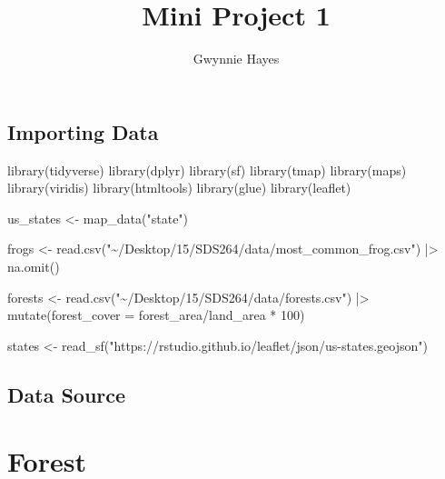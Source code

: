 \documentclass[
  letterpaper,
  DIV=11,
  numbers=noendperiod]{scrartcl}
\title{Mini Project 1}
\author{Gwynnie Hayes}
\date{}
\newenvironment{Shaded}{\begin{snugshade}}{\end{snugshade}}
\newcommand{\DecValTok}[1]{\textcolor[rgb]{0.68,0.00,0.00}{#1}}
\newcommand{\FunctionTok}[1]{\textcolor[rgb]{0.28,0.35,0.67}{#1}}
\newcommand{\NormalTok}[1]{\textcolor[rgb]{0.00,0.23,0.31}{#1}}
\newcommand{\OtherTok}[1]{\textcolor[rgb]{0.00,0.23,0.31}{#1}}
\newcommand{\SpecialCharTok}[1]{\textcolor[rgb]{0.37,0.37,0.37}{#1}}
\newcommand{\StringTok}[1]{\textcolor[rgb]{0.13,0.47,0.30}{#1}}
\begin{document}
\maketitle


\subsection{Importing Data}\label{importing-data}

\begin{Shaded}
\begin{Highlighting}[]
\FunctionTok{library}\NormalTok{(tidyverse)}
\FunctionTok{library}\NormalTok{(dplyr)}
\FunctionTok{library}\NormalTok{(sf)}
\FunctionTok{library}\NormalTok{(tmap)}
\FunctionTok{library}\NormalTok{(maps)}
\FunctionTok{library}\NormalTok{(viridis)}
\FunctionTok{library}\NormalTok{(htmltools)}
\FunctionTok{library}\NormalTok{(glue)}
\FunctionTok{library}\NormalTok{(leaflet)}

\NormalTok{us\_states }\OtherTok{\textless{}{-}} \FunctionTok{map\_data}\NormalTok{(}\StringTok{"state"}\NormalTok{)}

\NormalTok{frogs }\OtherTok{\textless{}{-}} \FunctionTok{read.csv}\NormalTok{(}\StringTok{"\textasciitilde{}/Desktop/15/SDS264/data/most\_common\_frog.csv"}\NormalTok{) }\SpecialCharTok{|\textgreater{}}
  \FunctionTok{na.omit}\NormalTok{()}

\NormalTok{forests }\OtherTok{\textless{}{-}} \FunctionTok{read.csv}\NormalTok{(}\StringTok{"\textasciitilde{}/Desktop/15/SDS264/data/forests.csv"}\NormalTok{) }\SpecialCharTok{|\textgreater{}}
  \FunctionTok{mutate}\NormalTok{(}\StringTok{\textquotesingle{}forest\_cover\textquotesingle{}} \OtherTok{=}\NormalTok{ forest\_area}\SpecialCharTok{/}\NormalTok{land\_area }\SpecialCharTok{*} \DecValTok{100}\NormalTok{)}

\NormalTok{states }\OtherTok{\textless{}{-}} \FunctionTok{read\_sf}\NormalTok{(}\StringTok{"https://rstudio.github.io/leaflet/json/us{-}states.geojson"}\NormalTok{)}
\end{Highlighting}
\end{Shaded}

\subsection{Data Source}\label{data-source}

\section{Forest}\label{forest}
\end{document}
